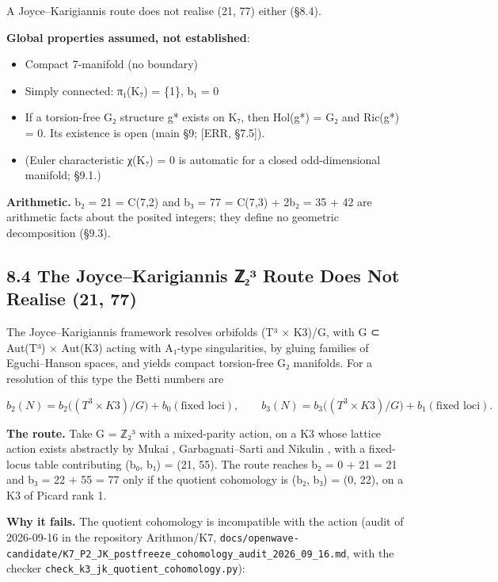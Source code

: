 \documentclass[11pt,a4paper]{article}
\begin{document}
A Joyce--Karigiannis route does not realise (21, 77) either (§8.4).

\textbf{Global properties assumed, not established}:

\begin{itemize}
\tightlist
\item
  Compact 7-manifold (no boundary)
\item
  Simply connected: π₁(K₇) = \{1\}, b₁ = 0
\item
  If a torsion-free G₂ structure g* exists on K₇, then Hol(g*) = G₂ \cite[Prop. 11.2.3]{20} and Ric(g*) = 0. Its existence is open (main §9; {[}ERR, §7.5{]}).
\item
  (Euler characteristic χ(K₇) = 0 is automatic for a closed odd-dimensional manifold; §9.1.)
\end{itemize}

\textbf{Arithmetic.} b₂ = 21 = C(7,2) and b₃ = 77 = C(7,3) + 2b₂ = 35 + 42 are arithmetic facts about the posited integers; they define no geometric decomposition (§9.3).

\subsection{8.4 The Joyce--Karigiannis ℤ₂³ Route Does Not Realise (21, 77)}\label{the-joycekarigiannis-ux2124ux2082uxb3-route-does-not-realise-21-77}

The Joyce--Karigiannis framework \cite{43} resolves orbifolds (T³ × K3)/G, with G ⊂ Aut(T³) × Aut(K3) acting with A₁-type singularities, by gluing families of Eguchi--Hanson spaces, and yields compact torsion-free G₂ manifolds. For a resolution of this type the Betti numbers are

\[b_2(N) = b_2\big((T^3 \times K3)/G\big) + b_0(\text{fixed loci}), \qquad b_3(N) = b_3\big((T^3 \times K3)/G\big) + b_1(\text{fixed loci}).\]

\textbf{The route.} Take G = ℤ₂³ with a mixed-parity action, on a K3 whose lattice action exists abstractly by Mukai \cite{44}, Garbagnati--Sarti \cite{45} and Nikulin \cite{51}, with a fixed-locus table contributing (b₀, b₁) = (21, 55). The route reaches b₂ = 0 + 21 = 21 and b₃ = 22 + 55 = 77 only if the quotient cohomology is (b₂, b₃) = (0, 22), on a K3 of Picard rank 1.

\textbf{Why it fails.} The quotient cohomology is incompatible with the action (audit of 2026-09-16 in the repository Arithmon/K7, \texttt{docs/\allowbreak{}openwave-\allowbreak{}candidate/\allowbreak{}K7\_\allowbreak{}P2\_\allowbreak{}JK\_\allowbreak{}postfreeze\_\allowbreak{}cohomology\_\allowbreak{}audit\_\allowbreak{}2026\_\allowbreak{}09\_\allowbreak{}16.\allowbreak{}md}, with the checker \texttt{check\_\allowbreak{}k3\_\allowbreak{}jk\_\allowbreak{}quotient\_\allowbreak{}cohomology.\allowbreak{}py}):
\end{document}
